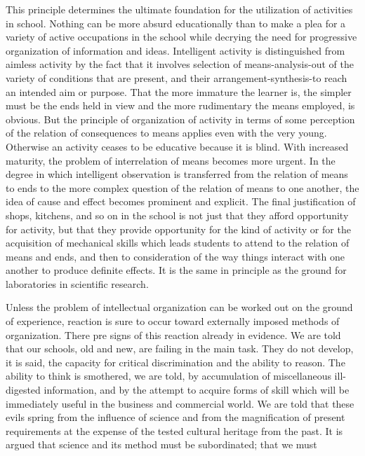 This principle determines the ultimate foundation for the utilization of activities in 
school. Nothing can be more absurd educationally than to make a plea for a variety of 
active occupations in the school while decrying the need for progressive organization of 
information and ideas. Intelligent activity is distinguished from aimless activity by the 
fact that it involves selection of means-analysis-out of the variety of conditions that are 
present, and their arrangement-synthesis-to reach an intended aim or purpose. That the 
more immature the learner is, the simpler must be the ends held in view and the more 
rudimentary the means employed, is obvious. But the principle of organization of activity 
in terms of some perception of the relation of consequences to means applies even with 
the very young. Otherwise an activity ceases to be educative because it is blind. With 
increased maturity, the problem of interrelation of means becomes more urgent. In the 
degree in which intelligent observation is transferred from the relation of means to ends 
to the more complex question of the relation of means to one another, the idea of cause 
and effect becomes prominent and explicit. The final justification of shops, kitchens, and 
so on in the school is not just that they afford opportunity for activity, but that they 
provide opportunity for the kind of activity or for the acquisition of mechanical skills 
which leads students to attend to the relation of means and ends, and then to 
consideration of the way things interact with one another to produce definite effects. It is 
the same in principle as the ground for laboratories in scientific research. 

Unless the problem of intellectual organization can be worked out on the ground of 
experience, reaction is sure to occur toward externally imposed methods of organization. 
There pre signs of this reaction already in evidence. We are told that our schools, old and 
new, are failing in the main task. They do not develop, it is said, the capacity for critical 
discrimination and the ability to reason. The ability to think is smothered, we are told, by 
accumulation of miscellaneous ill-digested information, and by the attempt to acquire 
forms of skill which will be immediately useful in the business and commercial world. 
We are told that these evils spring from the influence of science and from the 
magnification of present requirements at the expense of the tested cultural heritage from 
the past. It is argued that science and its method must be subordinated; that we must 



